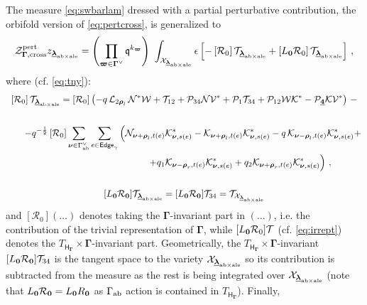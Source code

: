 \documentclass[12pt]{amsart}
\newcommand {\3}{\underline{\bf 3}}
\newcommand {\4}{\underline{\bf 4}}
\newcommand {\6}{\underline{\bf 6}}
\newcommand{\beq}{\begin{equation}}
\newcommand{\eeq}{\end{equation}}
\newcommand {\qe} {\mathfrak q}
\newcommand {\Hf} {\mathsf{H}}
\newcommand {\bnu} {{\boldsymbol{\nu}}}
\newcommand {\bro} {{\boldsymbol{\rho}}}
\newcommand {\bla} {\underline{\boldsymbol{\lambda}}}
\newcommand {\bom} {{\boldsymbol{\varpi}}}
\newcommand {\CalK} {\mathcal K}
\newcommand {\CalL} {\mathcal L}
\newcommand {\CalN} {\mathcal N}
\newcommand {\CalP} {\mathcal P}
\newcommand {\CalR} {\mathcal R}
\newcommand {\CalT} {\mathcal T}
\newcommand {\CalV} {\mathcal V}
\newcommand {\CalX} {\mathcal X}
\newcommand {\CalW} {\mathcal W}
\newcommand {\CalZ} {\mathcal Z}
\newcommand{\ep}{\epsilon}
\newcommand{\Gammadi}{\boldsymbol{\Gamma}}
\newcommand{\Gamab}{{\Gamma}_{\rm ab}}
\newcommand{\Gamav}{{\Gamma}^{\vee}_{\rm ab}}
\newcommand{\Eg}{\mathsf{Edge}_{\gamma}}
\begin{document}
{}The measure \eqref{eq:swbarlam} dressed with a partial perturbative contribution, the orbifold version of \eqref{eq:pertcross}, is generalized to 
\beq
{\CalZ}^{\rm pert}_{\Gammadi, \rm cross} z_{{\bla}_{{\rm ab}\times{\rm ale}}} = \left( \prod_{\bom \in {\Gammadi}^{\vee}}  {\qe}^{k_{\bom}} \right) \  \int_{{\CalX}_{{\bla}_{{\rm ab} \times {\rm ale}}}} {\ep} \left[ - \left[{\CalR}_{0} \right]{\CalT}_{{\bla}_{{\rm ab}\times{\rm ale}}} + \left[L_{\bf 0} {\CalR}_{0} \right]{\CalT}_{{\bla}_{{\rm ab}\times{\rm ale}}} \right] \, , 
\label{eq:swbarlamorb}
\eeq
where (cf. \eqref{eq:tny}):
\begin{multline}
 \left[{\CalR}_{0} \right]{\CalT}_{{\bla}_{{\rm ab}\times{\rm ale}}} =  \left[{\CalR}_{0} \right] \left(   - q\,  {\CalL}_{2\bro_{l}}\, {\CalN}^{*} {\CalW}+
  {\CalT}_{12} + {\CalP}_{34} {\CalN} {\CalV}^{*} + 
 {\CalP}_{1} {\CalT}_{34} + {\CalP}_{12} {\CalW} {\CalK}^{*}  -  {\CalP}_{\4} {\CalK}{\CalV}^{*} \right) \, -  \\
 \\
\qquad  - q^{-\frac 12} \left[{\CalR}_{0} \right] \sum_{\bnu \in {\Gamav}} \sum_{e \in \Eg} \left( {\CalN}_{{\bnu} + {\bro}_{l}, t(e)} 
 {\CalK}_{{\bnu}, s(e)}^{*} - {\CalK}_{{\bnu}+{\bro}_{l}, t(e)} {\CalK}_{{\bnu}, s(e)}^{*}
 - q\, {\CalK}_{{\bnu}-{\bro}_{l}, t(e)} {\CalK}_{{\bnu}, s(e)}^{*} + \right. \\
 \qquad\qquad \qquad\qquad\qquad\qquad \left. + 
 q_{1} {\CalK}_{{\bnu}-{\bro}_{r}, t(e)} {\CalK}_{{\bnu}, s(e)}^{*}
 + q_{2} {\CalK}_{{\bnu}+{\bro}_{r}, t(e)} {\CalK}_{{\bnu}, s(e)}^{*}\right)  \, , \\
  \\
 [L_{\bf 0} {\CalR}_{\bf 0}] {\CalT}_{{\bla}_{{\rm ab}\times{\rm ale}}} = 
 [L_{\bf 0}{\CalR}_{\bf 0}] {\CalT}_{34}   = 
 {\CalT}_{{\CalX}_{{\bla}_{{\rm ab}\times{\rm ale}}}} \\
\label{eq:tlamgamale}
\end{multline}
and $[{\CalR}_{0}]({\ldots})$ denotes taking the $\Gammadi$-invariant part in $({\ldots})$, i.e. the contribution of the trivial representation of $\Gammadi$, while $[L_{\bf 0}{\CalR}_{0}]{\CalT}$ (cf. \eqref{eq:irrept})
denotes the $T_{{\Hf}_{\Gammadi}} \times {\Gammadi}$-invariant part. Geometrically, the $T_{{\Hf}_{\Gammadi}} \times {\Gammadi}$-invariant $[L_{\bf 0}{\CalR}_{\bf 0}] {\CalT}_{34} $ is the tangent space to the variety ${\CalX}_{{\bla}_{{\rm ab}\times{\rm ale}}}$ so its contribution is subtracted from the measure as the rest is being integrated over ${\CalX}_{{\bla}_{{\rm ab}\times{\rm ale}}}$ (note that $L_{\bf 0}{\CalR}_{\bf 0} = L_{\bf 0}R_{\bf 0}$ as ${\Gamab}$ action is contained in $T_{{\Hf}_{\Gammadi}}$). Finally, 
\end{document}
